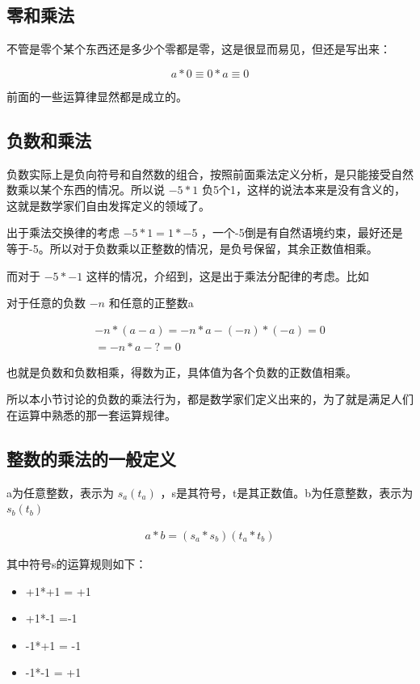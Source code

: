 \documentclass[12pt,oneside]{book}
\begin{document}
\subsection{零和乘法}
不管是零个某个东西还是多少个零都是零，这是很显而易见，但还是写出来：

\begin{equation}
a * 0 \equiv 0 * a \equiv 0
\end{equation}

前面的一些运算律显然都是成立的。


\subsection{负数和乘法}
负数实际上是负向符号和自然数的组合，按照前面乘法定义分析，是只能接受自然数乘以某个东西的情况。所以说 $-5*1$ 负5个1，这样的说法本来是没有含义的，这就是数学家们自由发挥定义的领域了。

出于乘法交换律的考虑 $-5*1=1*-5$ ，一个-5倒是有自然语境约束，最好还是等于-5。所以对于负数乘以正整数的情况，是负号保留，其余正数值相乘。

而对于 $-5*-1$ 这样的情况，\cite{什么是数学}介绍到，这是出于乘法分配律的考虑。比如

对于任意的负数 $-n$ 和任意的正整数a

\begin{align*}
-n * (a-a) = -n * a - (-n)*(-a) =0\\
=-n*a - ? =0
\end{align*}

也就是负数和负数相乘，得数为正，具体值为各个负数的正数值相乘。

所以本小节讨论的负数的乘法行为，都是数学家们定义出来的，为了就是满足人们在运算中熟悉的那一套运算规律。

\subsection{整数的乘法的一般定义}
a为任意整数，表示为 $s_a(t_a)$ ，s是其符号，t是其正数值。b为任意整数，表示为 $s_b(t_b)$ 

\begin{align}
a * b = (s_a*s_b)(t_a*t_b)
\end{align}

其中符号s的运算规则如下：

\begin{itemize}
\item +1*+1 = +1
\item +1*-1 =-1
\item -1*+1 = -1
\item -1*-1 = +1
\end{itemize}
\end{document}
